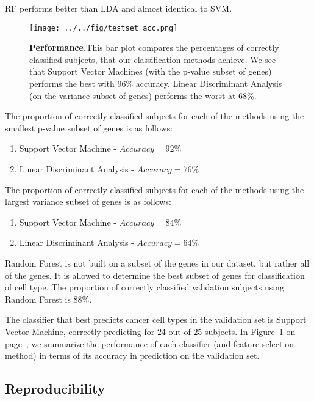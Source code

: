 RF performs better than LDA and almost identical to SVM.

\begin{figure}[H]
  \centering
    \texttt{[image: ../../fig/testset\_acc.png]}
\caption{\textbf{Performance.}This bar plot compares the percentages of correctly
  classified subjects, that our classification methods achieve. We see that
  Support Vector Machines (with the p-value subset of genes) performs the best
  with 96\% accuracy. Linear Discriminant Analysis (on the variance subset of
  genes) performs the worst at 68\%.}
   \label{fig:performance}
\end{figure}

The proportion of correctly classified subjects for each of the methods using
the smallest p-value subset of genes is as follows:

\begin{enumerate}
\item Support Vector Machine - $Accuracy = 92\%$
\item Linear Discriminant Analysis - $Accuracy = 76\%$
\end{enumerate}

The proportion of correctly classified subjects for each of the methods using
the largest variance subset of genes is as follows:

\begin{enumerate}
\item Support Vector Machine - $Accuracy = 84\% $
\item Linear Discriminant Analysis - $Accuracy =64\% $
\end{enumerate}

Random Forest is not built on a subset of the genes in our dataset, but rather
all of the genes. It is allowed to determine the best subset of genes for
classification of cell type. The proportion of correctly classified validation
subjects using Random Forest is $88\%$.

The classifier that best predicts cancer cell types in the validation set is
Support Vector Machine, correctly predicting for $24$ out of $25$ subjects.
In Figure~\ref{fig:performance} on page~\pageref{fig:performance}, we
summarize the performance of each classifier (and feature selection
method) in terms of its accuracy in prediction on the validation set.

\subsection*{Reproducibility}

